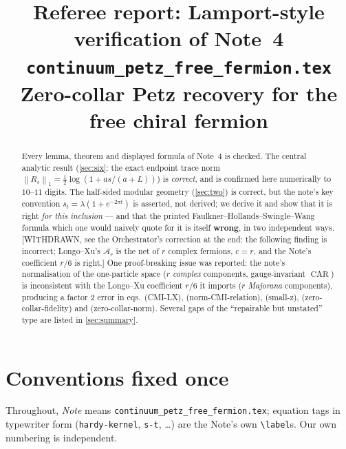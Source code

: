 \documentclass[11pt]{article}
\title{Referee report: Lamport-style verification of Note~4\\
\large \texttt{continuum\_petz\_free\_fermion.tex}\\[.3em]
\normalsize Zero-collar Petz recovery for the free chiral fermion}
\author{}\date{}
\newcommand{\norm}[1]{\left\lVert #1\right\rVert}
\newcommand{\CAR}{\operatorname{CAR}}
\begin{document}
\maketitle

\begin{abstract}\noindent
Every lemma, theorem and displayed formula of Note~4 is checked. The central
analytic result (\cref{sec:six}: the exact endpoint trace norm
$\norm{R_s}_1=\tfrac12\log(1+as/(a+L))$) is \emph{correct}, and is confirmed
here numerically to $10$--$11$ digits. The half-sided modular geometry
(\cref{sec:two}) is correct, but the note's key convention
$s_t=\lambda(1+e^{-2\pi t})$ is asserted, not derived; we derive it and show
that it is right \emph{for this inclusion} --- and that the printed
Faulkner--Hollands--Swingle--Wang formula \cite[eq.~(167)]{FHSW} which one
would naively quote for it is itself \textbf{wrong}, in two independent ways.
[WITHDRAWN, see the Orchestrator's correction at the end: the following finding is incorrect; Longo--Xu's $\mathcal A_r$ is the net of $r$ complex fermions, $c=r$, and the Note's coefficient $r/6$ is right.] One proof-breaking issue was reported: the note's normalisation of the
one-particle space ($r$ \emph{complex} components, gauge-invariant
$\CAR$) is inconsistent with the Longo--Xu coefficient $r/6$ it imports
($r$ \emph{Majorana} components), producing a factor $2$ error in
eqs.~(CMI-LX), (norm-CMI-relation), (small-z), (zero-collar-fidelity) and
(zero-collar-norm). Several gaps of the ``repairable but unstated'' type are
listed in \cref{sec:summary}.
\end{abstract}

\tableofcontents
\clearpage

\section{Conventions fixed once}\label{sec:conv}

Throughout, \emph{Note} means \texttt{continuum\_petz\_free\_fermion.tex};
equation tags in typewriter form (\texttt{hardy-kernel},
\texttt{s-t}, \dots) are the Note's own \verb|\label|s. Our own numbering is
independent.
\end{document}
